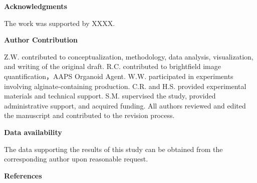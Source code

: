\documentclass[
]{article}
\begin{document}
\textbf{Acknowledgments}

The work was supported by XXXX.

\textbf{Author Contribution}

Z.W. contributed to conceptualization, methodology, data analysis, visualization, and writing of the original draft. R.C. contributed to brightfield image quantification，AAPS Organoid Agent. W.W. participated in experiments involving alginate-containing production. C.R. and H.S. provided experimental materials and technical support. S.M. supervised the study, provided administrative support, and acquired funding. All authors reviewed and edited the manuscript and contributed to the revision process.

\textbf{Data availability}

The data supporting the results of this study can be obtained from the corresponding author upon reasonable request.

\textbf{References}
\end{document}
